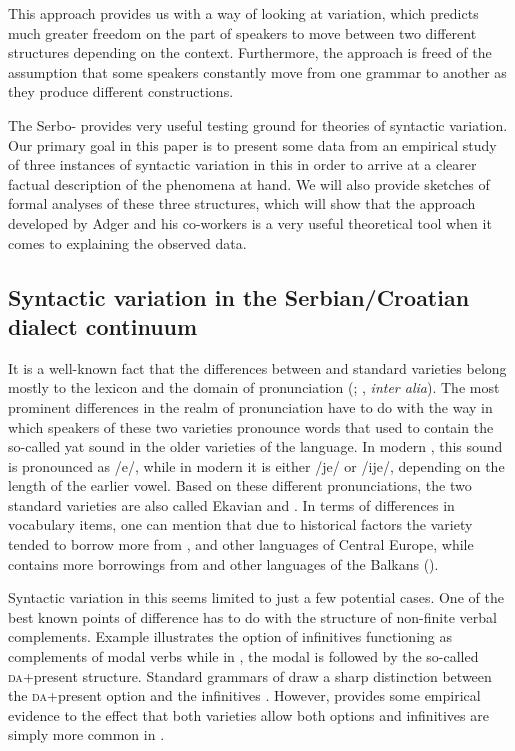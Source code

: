 \documentclass[output=paper,modfonts,newtxmath,hidelinks,]{langscibook}
\begin{document}
This approach provides us with a way of looking at variation, which predicts much greater freedom on the part of speakers to move between two different structures depending on the context. Furthermore, the approach is freed of the assumption that some speakers constantly move from one grammar to another as they produce different constructions.

The Serbo-  provides very useful testing ground for theories of syntactic variation. Our primary goal in this paper is to present some data from an empirical study of three instances of syntactic variation in this  in order to arrive at a clearer factual description of the phenomena at hand. We will also provide sketches of formal analyses of these three structures, which will show that the approach developed by Adger and his co-workers is a very useful theoretical tool when it comes to explaining the observed data.

\subsection{Syntactic variation in the Serbian/Croatian dialect continuum}\label{7:s1.2}

It is a well-known fact that the differences between  and  standard varieties belong mostly to the lexicon and the domain of pronunciation (\citealt{CorbettBrowne2009}; \citealt{Bailyn2010}, \textit{inter alia}). The most prominent differences in the realm of pronunciation have to do with the way in which speakers of these two varieties pronounce words that used to contain the so-called yat sound in the older varieties of the language. In modern , this sound is pronounced as /e/, while in modern  it is either /je/ or /ije/, depending on the length of the earlier vowel. Based on these different pronunciations, the two standard varieties are also called Ekavian and . In terms of differences in vocabulary items, one can mention that due to historical factors the  variety tended to borrow more from ,  and other languages of Central Europe, while  contains more borrowings from  and other languages of the Balkans (\citealt{CorbettBrowne2009}).

Syntactic variation in this  seems limited to just a few potential cases. One of the best known points of difference has to do with the structure of non-finite verbal complements. Example  illustrates the option of infinitives functioning as complements of modal verbs while in , the modal is followed by the so-called \textsc{da}+present structure. Standard grammars of  draw a sharp distinction between the  \textsc{da}+present option and the  infinitives \citep{Katicic}. However, \citet{Bailyn2010} provides some empirical evidence to the effect that both varieties allow both options and infinitives are simply more common in .
\end{document}
